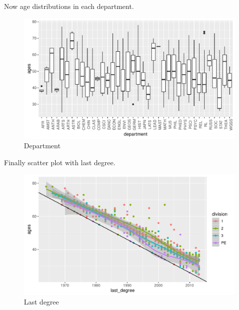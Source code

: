 \documentclass{article}\usepackage[]{graphicx}\usepackage[]{color}
\makeatletter
\def\maxwidth{ %
  \ifdim\Gin@nat@width>\linewidth
    \linewidth
  \else
    \Gin@nat@width
  \fi
}
\newenvironment{knitrout}{}{} %
\makeatother
\begin{document}
Now age distributions in each department.
\begin{knitrout}
\color{fgcolor}\begin{figure}[h]
\includegraphics[width=\maxwidth]{figure/unnamed-chunk-5-1} \caption[Department]{Department}\label{fig:unnamed-chunk-5}
\end{figure}


\end{knitrout}

Finally scatter plot with last degree.
\begin{knitrout}
\color{fgcolor}\begin{figure}[h]
\includegraphics[width=\maxwidth]{figure/unnamed-chunk-6-1} \caption[Last degree]{Last degree}\label{fig:unnamed-chunk-6}
\end{figure}


\end{knitrout}
\end{document}
